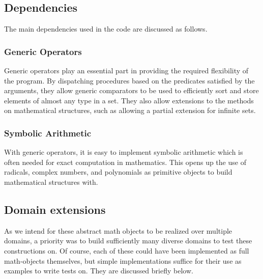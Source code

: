 \documentclass{article}
\begin{document}
        \subsection{Dependencies}
            
            The main dependencies used in the code are discussed as follows.
            
            \subsubsection{Generic Operators}
                
                Generic operators play an essential part in providing the required flexibility of the program. By dispatching procedures based on the predicates satisfied by the arguments, they allow generic comparators to be used to efficiently sort and store elements of almost any type in a set. They also allow extensions to the methods on mathematical structures, such as allowing a partial extension for infinite sets.
            
            \subsubsection{Symbolic Arithmetic}
                
                With generic operators, it is easy to implement symbolic arithmetic which is often needed for exact computation in mathematics. This opens up the use of radicals, complex numbers, and polynomials as primitive objects to build mathematical structures with.
            
                
        
        \subsection{Domain extensions}
            
            As we intend for these abstract math objects to be realized over multiple domains, a priority was to build sufficiently many diverse domains to test these constructions on. Of course, each of these could have been implemented as full math-objects themselves, but simple implementations suffice for their use as examples to write tests on. They are discussed briefly below.
            
\end{document}
